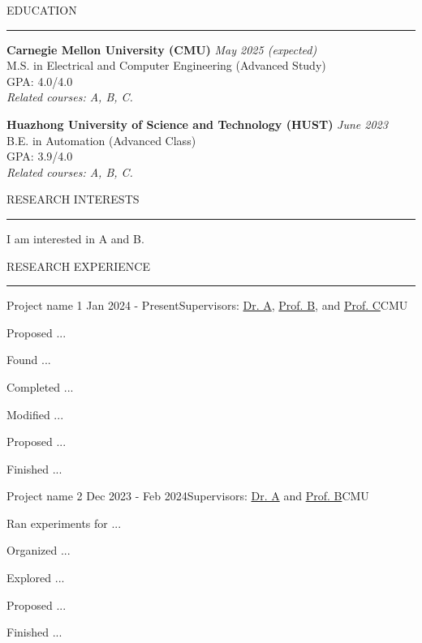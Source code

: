 \documentclass{resume} %
\renewenvironment{rSection}[1]{
	\sectionskip
	\textcolor{CarnegieMellonRed}{\MakeUppercase{#1}}
	\sectionlineskip
	\hrule
	\begin{list}{}{
			\setlength{\leftmargin}{1.5em}
		}
		\item[]
			}{
	\end{list}
}
\begin{document}
\begin{rSection}{Education}
	{\bf Carnegie Mellon University (CMU)} \hfill {\em May 2025 (expected)}
	\\ M.S. in Electrical and Computer Engineering (Advanced Study)\hfill
	\\ GPA: 4.0/4.0 \hfill
	\\ \textit{Related courses: A, B, C. }

	{\bf Huazhong University of Science and Technology (HUST)} \hfill {\em June 2023}
	\\ B.E. in Automation (Advanced Class)
	\\ \qquad GPA: 3.9/4.0\qquad  \hfill
	\\ \textit{Related courses: A, B, C.
	}

\end{rSection}

\begin{rSection}{Research Interests}
	I am interested in A and B.
\end{rSection}


\begin{rSection}{Research Experience}
	\begin{rSubsection}{Project name 1 \cite{paper1}}{Jan 2024 - Present}{Supervisors: \href{https://example.com/}{Dr. A}, \href{https://example.com/}{Prof. B}, and \href{https://example.com/}{Prof. C}}{CMU}
		\item Proposed ...
		\item Found ...
		\item Completed ...
		\item Modified ...
		\item Proposed ...
		\item Finished ...
	\end{rSubsection}


	\begin{rSubsection}{Project name 2 \cite{paper2}}{Dec 2023 - Feb 2024}{Supervisors: \href{https://example.weebly.com/}{Dr. A} and \href{https://www.ece.cmu.edu/directory/bios/example}{Prof. B}}{CMU}
		\item Ran experiments for ...
		\item Organized ...
		\item Explored ...
		\item Proposed ...
		\item Finished ...
	\end{rSubsection}
\end{rSection}
\end{document}
